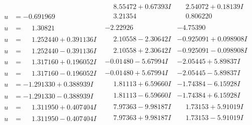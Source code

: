 \documentclass[1p]{elsarticle_modified}
\theoremstyle{definition}
\begin{document}
$$\begin{array}{c|c|c}
 & \phantom{-}8.55472 + 0.67393 I & \phantom{-}2.54072 + 0.18139 I \\ \hline\begin{aligned}
u &= -0.691969\phantom{ +0.000000I}\end{aligned}
 & \phantom{-}3.21354\phantom{ +0.000000I} & \phantom{-}0.806220\phantom{ +0.000000I} \\ \hline\begin{aligned}
u &= \phantom{-}1.30821\phantom{ +0.000000I}\end{aligned}
 & -2.22926\phantom{ +0.000000I} & -4.75390\phantom{ +0.000000I} \\ \hline\begin{aligned}
u &= \phantom{-}1.252440 + 0.391136 I\end{aligned}
 & \phantom{-}2.10558 - 2.30642 I & -0.925091 + 0.098908 I \\ \hline\begin{aligned}
u &= \phantom{-}1.252440 - 0.391136 I\end{aligned}
 & \phantom{-}2.10558 + 2.30642 I & -0.925091 - 0.098908 I \\ \hline\begin{aligned}
u &= \phantom{-}1.317160 + 0.196052 I\end{aligned}
 & -0.01480 - 5.67994 I & -2.05445 + 5.89837 I \\ \hline\begin{aligned}
u &= \phantom{-}1.317160 - 0.196052 I\end{aligned}
 & -0.01480 + 5.67994 I & -2.05445 - 5.89837 I \\ \hline\begin{aligned}
u &= -1.291330 + 0.388939 I\end{aligned}
 & \phantom{-}1.81113 + 6.59660 I & -1.74384 - 6.15928 I \\ \hline\begin{aligned}
u &= -1.291330 - 0.388939 I\end{aligned}
 & \phantom{-}1.81113 - 6.59660 I & -1.74384 + 6.15928 I \\ \hline\begin{aligned}
u &= \phantom{-}1.311950 + 0.407404 I\end{aligned}
 & \phantom{-}7.97363 - 9.98187 I & \phantom{-}1.73153 + 5.91019 I \\ \hline\begin{aligned}
u &= \phantom{-}1.311950 - 0.407404 I\end{aligned}
 & \phantom{-}7.97363 + 9.98187 I & \phantom{-}1.73153 - 5.91019 I \\ \hline\begin{aligned}

\end{aligned}
\end{array}$$
\end{document}

